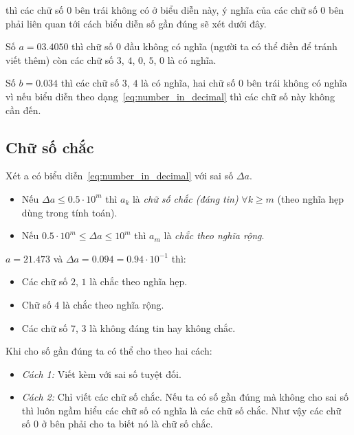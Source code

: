 \documentclass[../../Lectures.tex]{subfiles}
\begin{document}
thì các chữ số \(0\) bên trái không có ở biểu diễn này, ý nghĩa của các chữ số
\(0\) bên phải liên quan tới cách biểu diễn số gần đúng sẽ xét dưới đây.

\begin{exmp}
    Số \(a = 03.4050\) thì chữ số \(0\) đầu không có nghĩa (người ta có thể điền
    để tránh viết thêm) còn các chữ số \(3\), \(4\), \(0\), \(5\), \(0\) là có
    nghĩa.

    Số \(b = 0.034\) thì các chữ số \(3\), \(4\) là có nghĩa, hai chữ số \(0\)
    bên trái không có nghĩa vì nếu biểu diễn theo dạng~\ref{eq:number_in_decimal}
    thì các chữ số này không cần đến.
\end{exmp}

\subsection{Chữ số chắc}

\begin{definition}
    Xét a có biểu diễn~\ref{eq:number_in_decimal} với sai số \(\Delta a\).

    \begin{itemize}
        \item Nếu \(\Delta a \leq \num{0.5} \cdot 10^m\) thì \(a_k\) là
            \emph{chữ số chắc (đáng tin)} \(\forall k \geq m\) (theo nghĩa hẹp
            dùng trong tính toán).

        \item Nếu \(\num{0.5} \cdot 10^m \leq \Delta a \leq 10^m\) thì \(a_m\)
            là \emph{chắc theo nghĩa rộng}.
    \end{itemize}
\end{definition}

\begin{exmp}
    \(a = \num{21.473}\) và \(\Delta a = \num{0.094} = \num{0.94} \cdot
    10^{-1}\) thì:

    \begin{itemize}
        \item Các chữ số \(2\), \(1\) là chắc theo nghĩa hẹp.
        \item Chữ số \(4\) là chắc theo nghĩa rộng.
        \item Các chữ số \(7\), \(3\) là không đáng tin hay không chắc.
    \end{itemize}
\end{exmp}

Khi cho số gần đúng ta có thể cho theo hai cách:

\begin{itemize}
    \item \emph{Cách 1:} Viết kèm với sai số tuyệt đối.
    \item \emph{Cách 2:} Chỉ viết các chữ số chắc. Nếu ta có số gần đúng mà
        không cho sai số thì luôn ngầm hiểu các chữ số có nghĩa là các chữ số
        chắc. Như vậy các chữ số 0 ở bên phải cho ta biết nó là chữ số chắc.
\end{itemize}
\end{document}
